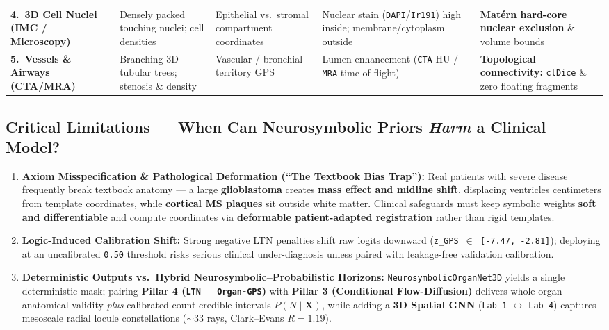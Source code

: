 \documentclass[10pt,a4paper]{article}
\begin{document}
{\begin{xltabular}{\textwidth}{L{2.9cm} L{2.75cm} L{3.45cm} L{3.45cm} Y}
\textbf{4.\ 3D Cell Nuclei (IMC / Microscopy)} & Densely packed touching nuclei; cell densities & Epithelial vs.\ stromal compartment coordinates & Nuclear stain (\texttt{DAPI}/\texttt{Ir191}) high inside; membrane/cytoplasm outside & \textbf{Mat\'ern hard-core nuclear exclusion} \& volume bounds \\
\textbf{5.\ Vessels \& Airways (CTA/MRA)} & Branching 3D tubular trees; stenosis \& density & Vascular / bronchial territory GPS & Lumen enhancement (\texttt{CTA} HU / \texttt{MRA} time-of-flight) & \textbf{Topological connectivity:} \texttt{clDice} \& zero floating fragments \\
\end{xltabular}
}

\subsection{Critical Limitations --- When Can Neurosymbolic Priors \textit{Harm} a Clinical Model?}
\begin{enumerate}
    \item \textbf{Axiom Misspecification \& Pathological Deformation (``The Textbook Bias Trap''):} Real patients with severe disease frequently break textbook anatomy --- a large \textbf{glioblastoma} creates \textbf{mass effect and midline shift}, displacing ventricles centimeters from template coordinates, while \textbf{cortical MS plaques} sit outside white matter. Clinical safeguards must keep symbolic weights \textbf{soft and differentiable} and compute coordinates via \textbf{deformable patient-adapted registration} rather than rigid templates.
    \item \textbf{Logic-Induced Calibration Shift:} Strong negative LTN penalties shift raw logits downward (\texttt{z\_GPS $\in$ [-7.47, -2.81]}); deploying at an uncalibrated \texttt{0.50} threshold risks serious clinical under-diagnosis unless paired with leakage-free validation calibration.
    \item \textbf{Deterministic Outputs vs.\ Hybrid Neurosymbolic--Probabilistic Horizons:} \texttt{NeurosymbolicOrganNet3D} yields a single deterministic mask; pairing \textbf{Pillar 4 (\texttt{LTN} + \texttt{Organ-GPS})} with \textbf{Pillar 3 (Conditional Flow-Diffusion)} delivers whole-organ anatomical validity \textit{plus} calibrated count credible intervals $P(N \mid \mathbf{X})$, while adding a \textbf{3D Spatial GNN} (\texttt{Lab 1} $\leftrightarrow$ \texttt{Lab 4}) captures mesoscale radial locule constellations ($\sim 33$ rays, Clark--Evans $R=1.19$).
\end{enumerate}
\end{document}
